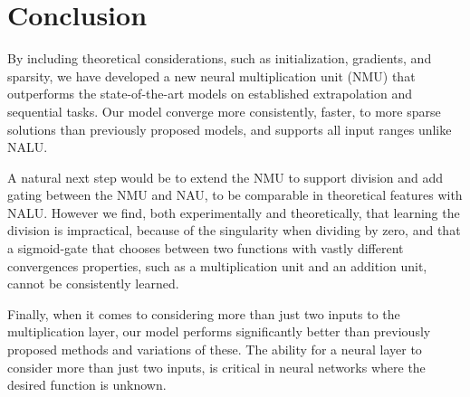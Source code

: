 \section{Conclusion}
By including theoretical considerations, such as initialization, gradients, and sparsity, we have developed a new neural multiplication unit (NMU) that outperforms the state-of-the-art models on established extrapolation and sequential tasks.
Our model converge more consistently, faster, to more sparse solutions than previously proposed models, and supports all input ranges unlike NALU.

A natural next step would be to extend the NMU to support division and add gating between the NMU and NAU, to be comparable in theoretical features with NALU.
However we find, both experimentally and theoretically, that learning the division is impractical, because of the singularity when dividing by zero, and that a sigmoid-gate that chooses between two functions with vastly different convergences properties, such as a multiplication unit and an addition unit, cannot be consistently learned.

Finally, when it comes to considering more than just two inputs to the multiplication layer, our model performs significantly better than previously proposed methods and variations of these.
The ability for a neural layer to consider more than just two inputs, is critical in neural networks where the desired function is unknown.